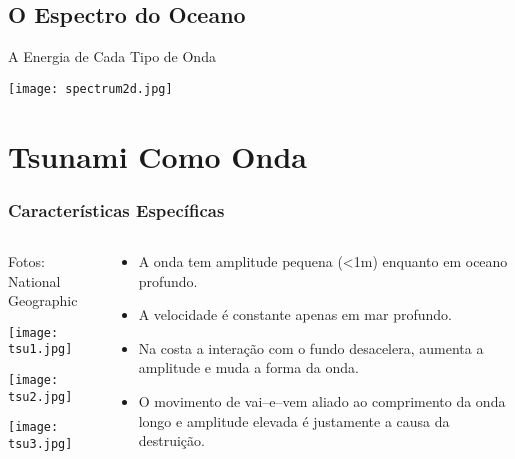\documentclass{beamer}
\begin{document}
\subsection{O Espectro do Oceano}
\begin{frame}[label=espectro]{A Energia de Cada Tipo de Onda}
  \centerline{\texttt{[image: spectrum2d.jpg]}}
\end{frame}
\section{Tsunami Como Onda}
\begin{frame}
  \frametitle{Características Específicas}
  \begin{columns}
    \begin{column}{3.5cm}   
      \tiny{Fotos: National Geographic}

      \texttt{[image: tsu1.jpg]}

      \texttt{[image: tsu2.jpg]}

      \texttt{[image: tsu3.jpg]}
    \end{column}
    \begin{column}{8.5cm}
      \begin{itemize}\setlength{\itemsep}{2ex}
      \item A onda tem amplitude pequena (<1m) enquanto
        em oceano profundo.
      \item A velocidade é constante apenas em
        mar profundo. 
      \item \alert{Na costa a interação com o fundo desacelera, aumenta a
          amplitude e muda a forma da onda}.
      \item O movimento de vai--e--vem aliado ao \alert{comprimento da onda
          longo e amplitude elevada} é justamente a causa da destruição. 
      \end{itemize}
    \end{column}    
  \end{columns}  
\end{frame}
\end{document}
